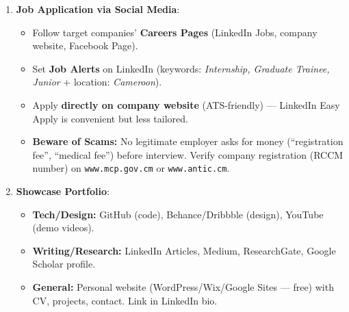 \documentclass[11pt]{article}
\begin{document}
\begin{methode}
\begin{enumerate}
    \item \textbf{Job Application via Social Media}:
          \begin{itemize}
              \item Follow target companies' \textbf{Careers Pages} (LinkedIn Jobs, company website, Facebook Page).
              \item Set \textbf{Job Alerts} on LinkedIn (keywords: \textit{Internship, Graduate Trainee, Junior} + location: \textit{Cameroon}).
              \item Apply \textbf{directly on company website} (ATS-friendly) — LinkedIn Easy Apply is convenient but less tailored.
              \item \textbf{Beware of Scams:} No legitimate employer asks for money (``registration fee'', ``medical fee'') before interview. Verify company registration (RCCM number) on \texttt{www.mcp.gov.cm} or \texttt{www.antic.cm}.
          \end{itemize}
    \item \textbf{Showcase Portfolio}:
          \begin{itemize}
              \item \textbf{Tech/Design:} GitHub (code), Behance/Dribbble (design), YouTube (demo videos).
              \item \textbf{Writing/Research:} LinkedIn Articles, Medium, ResearchGate, Google Scholar profile.
              \item \textbf{General:} Personal website (WordPress/Wix/Google Sites — free) with CV, projects, contact. Link in LinkedIn bio.
          \end{itemize}
\end{enumerate}
\end{methode}
\end{document}
